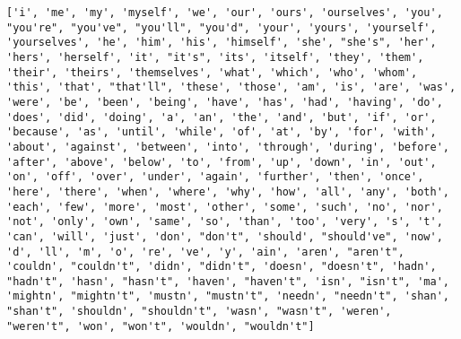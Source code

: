 \documentclass[11pt]{article}
\begin{document}
    \begin{Verbatim}[commandchars=\\\{\}]
['i', 'me', 'my', 'myself', 'we', 'our', 'ours', 'ourselves', 'you', "you're", "you've", "you'll", "you'd", 'your', 'yours', 'yourself', 'yourselves', 'he', 'him', 'his', 'himself', 'she', "she's", 'her', 'hers', 'herself', 'it', "it's", 'its', 'itself', 'they', 'them', 'their', 'theirs', 'themselves', 'what', 'which', 'who', 'whom', 'this', 'that', "that'll", 'these', 'those', 'am', 'is', 'are', 'was', 'were', 'be', 'been', 'being', 'have', 'has', 'had', 'having', 'do', 'does', 'did', 'doing', 'a', 'an', 'the', 'and', 'but', 'if', 'or', 'because', 'as', 'until', 'while', 'of', 'at', 'by', 'for', 'with', 'about', 'against', 'between', 'into', 'through', 'during', 'before', 'after', 'above', 'below', 'to', 'from', 'up', 'down', 'in', 'out', 'on', 'off', 'over', 'under', 'again', 'further', 'then', 'once', 'here', 'there', 'when', 'where', 'why', 'how', 'all', 'any', 'both', 'each', 'few', 'more', 'most', 'other', 'some', 'such', 'no', 'nor', 'not', 'only', 'own', 'same', 'so', 'than', 'too', 'very', 's', 't', 'can', 'will', 'just', 'don', "don't", 'should', "should've", 'now', 'd', 'll', 'm', 'o', 're', 've', 'y', 'ain', 'aren', "aren't", 'couldn', "couldn't", 'didn', "didn't", 'doesn', "doesn't", 'hadn', "hadn't", 'hasn', "hasn't", 'haven', "haven't", 'isn', "isn't", 'ma', 'mightn', "mightn't", 'mustn', "mustn't", 'needn', "needn't", 'shan', "shan't", 'shouldn', "shouldn't", 'wasn', "wasn't", 'weren', "weren't", 'won', "won't", 'wouldn', "wouldn't"]

    \end{Verbatim}
\end{document}
